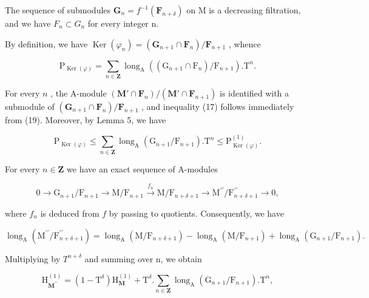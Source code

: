The sequence of submodules \(\mathbf{G}_{n}=f^{-1}(\mathbf{F}_{n+\delta})\) on M is a decreasing filtration, and we have \(F_{n}\subset G_{n}\) for every integer n.

By definition, we have \(\operatorname{Ker}(\varphi_n) = (\mathbf{G}_{n+1} \cap \mathbf{F}_n)/\mathbf{F}_{n+1}\) , whence

\[
\mathrm{P} _ {\operatorname{Ker} (\varphi)} = \sum_ {n \in \mathbf {Z}} \operatorname{long} _ {\mathrm{A}} ((\mathrm{G} _ {n + 1} \cap \mathrm{F} _ {n}) / \mathrm{F} _ {n + 1}). \mathrm{T} ^ {n}.\tag{19}
\]

For every \(n\) , the A-module \((\mathbf{M}' \cap \mathbf{F}_n) / (\mathbf{M}' \cap \mathbf{F}_{n+1})\) is identified with a submodule of \((\mathbf{G}_{n+1} \cap \mathbf{F}_n) / \mathbf{F}_{n+1}\) , and inequality (17) follows immediately from (19). Moreover, by Lemma 5, we have

\[
\mathrm{P} _ {\operatorname{Ker} (\varphi)} \leqslant \sum_ {n \in \mathbf {Z}} \operatorname{long} _ {\mathrm{A}} \left(\mathrm{G} _ {n + 1} / \mathrm{F} _ {n + 1}\right). \mathrm{T} ^ {n} \leqslant \mathrm{P} _ {\operatorname{Ker} (\varphi)} ^ {(1)}.\tag{20}
\]

For every \(n \in \mathbf{Z}\) we have an exact sequence of A-modules

\[
0 \longrightarrow \mathrm{G} _ {n + 1} / \mathrm{F} _ {n + 1} \longrightarrow \mathrm{M} / \mathrm{F} _ {n + 1} \xrightarrow {f _ {n}} \mathrm{M} / \mathrm{F} _ {n + \delta + 1} \longrightarrow \mathrm{M} ^ {\prime \prime} / \mathrm{F} _ {n + \delta + 1} ^ {\prime \prime} \longrightarrow 0,
\]

where \(f_{n}\) is deduced from \(f\) by passing to quotients. Consequently, we have

\[
\operatorname{long} _ {\mathrm{A}} \left(\mathrm{M} ^ {\prime \prime} / \mathrm{F} _ {n + \delta + 1} ^ {\prime \prime}\right) = \operatorname{long} _ {\mathrm{A}} \left(\mathrm{M} / \mathrm{F} _ {n + \delta + 1}\right) - \operatorname{long} _ {\mathrm{A}} \left(\mathrm{M} / \mathrm{F} _ {n + 1}\right) + \operatorname{long} _ {\mathrm{A}} \left(\mathrm{G} _ {n + 1} / \mathrm{F} _ {n + 1}\right).
\]

Multiplying by \(T^{n+\delta}\) and summing over n, we obtain

\[
\mathrm{H} _ {\mathbf {M} ^ {\prime \prime}} ^ {(1)} = (1 - \mathrm{T} ^ {\delta}) \mathrm{H} _ {\mathbf {M}} ^ {(1)} + \mathrm{T} ^ {\delta}. \sum_ {n \in \mathbf {Z}} \operatorname{long} _ {\mathrm{A}} (\mathrm{G} _ {n + 1} / \mathrm{F} _ {n + 1}). \mathrm{T} ^ {n},\tag{21}
\]

